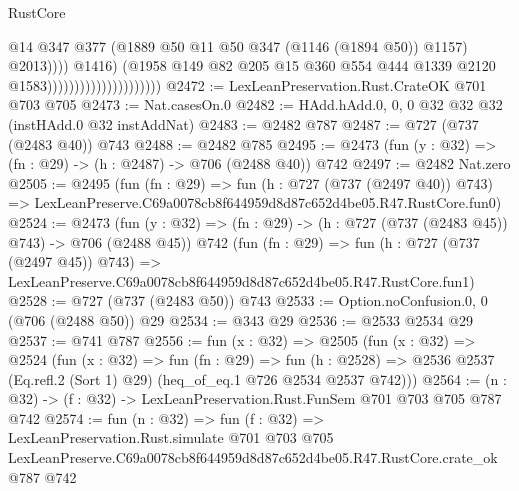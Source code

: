 \begin{lexlean}{RustCore}
\begin{coremodule}
                                                      @14
                                                      @347
                                                      @377
                                                      (@1889
                                                        @50
                                                        @11
                                                        @50
                                                        @347
                                                        (@1146 (@1894 @50))
                                                        @1157)
                                                      @2013))))
                                              @1416)
                                            (@1958
                                              @149
                                              @82
                                              @205
                                              @15
                                              @360
                                              @554
                                              @444
                                              @1339
                                              @2120
                                              @1583)))))))))))))))))))))
@2472 := LexLeanPreservation.Rust.CrateOK @701 @703 @705
@2473 := Nat.casesOn.{0}
@2482 := HAdd.hAdd.{0, 0, 0} @32 @32 @32 (instHAdd.{0} @32 instAddNat)
@2483 := @2482 @787
@2487 := @727 (@737 (@2483 @40)) @743
@2488 := @2482 @785
@2495 := @2473 (fun (y : @32) => (fn : @29) -> (h : @2487) -> @706 (@2488 @40)) @742
@2497 := @2482 Nat.zero
@2505 := @2495
    (fun (fn : @29) =>
    fun (h : @727 (@737 (@2497 @40)) @743) =>
    LexLeanPreserve.C69a0078cb8f644959d8d87c652d4be05.R47.RustCore.fun0)
@2524 := @2473
    (fun (y : @32) => (fn : @29) -> (h : @727 (@737 (@2483 @45)) @743) -> @706 (@2488 @45))
    @742
    (fun (fn : @29) =>
    fun (h : @727 (@737 (@2497 @45)) @743) =>
    LexLeanPreserve.C69a0078cb8f644959d8d87c652d4be05.R47.RustCore.fun1)
@2528 := @727 (@737 (@2483 @50)) @743
@2533 := Option.noConfusion.{0, 0} (@706 (@2488 @50)) @29
@2534 := @343 @29
@2536 := @2533 @2534 @29
@2537 := @741 @787
@2556 := fun (x : @32) =>
  @2505
    (fun (x : @32) =>
    @2524
      (fun (x : @32) =>
      fun (fn : @29) =>
      fun (h : @2528) =>
      @2536 @2537 (Eq.refl.{2} (Sort 1) @29) (heq_of_eq.{1} @726 @2534 @2537 @742)))
@2564 := (n : @32) -> (f : @32) -> LexLeanPreservation.Rust.FunSem @701 @703 @705 @787 @742
@2574 := fun (n : @32) =>
  fun (f : @32) =>
  LexLeanPreservation.Rust.simulate
    @701
    @703
    @705
    LexLeanPreserve.C69a0078cb8f644959d8d87c652d4be05.R47.RustCore.crate_ok
    @787
    @742
\end{coremodule}
\end{lexlean}
